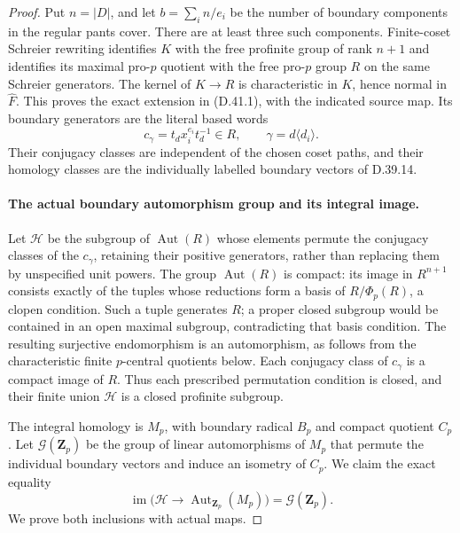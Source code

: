 \begin{proof}
Put \(n=|D|\), and let \(b=\sum_i n/e_i\) be the number
of boundary components in the regular pants cover.
There are at least three such components.
Finite-coset Schreier rewriting identifies \(K\)
with the free profinite group of rank \(n+1\)
and identifies its maximal pro-\(p\) quotient
with the free pro-\(p\) group \(R\) on the same
Schreier generators.
The kernel of \(K\to R\) is characteristic in \(K\),
hence normal in \(\widehat F\).
This proves the exact extension in
\textup{(D.41.1)}, with the indicated source map.
Its boundary generators are the literal based words
\[
 c_\gamma=t_d x_i^{e_i}t_d^{-1}\in R,
       \qquad
 \gamma=d\langle d_i\rangle.
 \tag{D.41.2}
\]
Their conjugacy classes are independent of the
chosen coset paths, and their homology classes
are the individually labelled boundary vectors
of D.39.14.

\paragraph{The actual boundary automorphism group and its integral image.}
Let \(\mathcal H\) be the subgroup of
\(\operatorname{Aut}(R)\) whose elements permute
the conjugacy classes of the \(c_\gamma\), retaining
their positive generators, rather than replacing
them by unspecified unit powers.
The group \(\operatorname{Aut}(R)\) is compact:
its image in \(R^{n+1}\) consists exactly of the
tuples whose reductions form a basis of
\(R/\Phi_p(R)\), a clopen condition.
Such a tuple generates \(R\); a proper closed
subgroup would be contained in an open maximal
subgroup, contradicting that basis condition.
The resulting surjective endomorphism is an
automorphism, as follows from the characteristic
finite \(p\)-central quotients below.
Each conjugacy class of \(c_\gamma\) is a compact
image of \(R\).  Thus each prescribed permutation
condition is closed, and their finite union
\(\mathcal H\) is a closed profinite subgroup.

The integral homology is \(M_p\), with boundary
radical \(B_p\) and compact quotient \(C_p\).
Let \(\mathcal G(\mathbf Z_p)\) be the group of
linear automorphisms of \(M_p\) that permute the
individual boundary vectors and induce an
isometry of \(C_p\).
We claim the exact equality
\[
 \operatorname{im}\bigl(\mathcal H\to
               \operatorname{Aut}_{\mathbf Z_p}(M_p)\bigr)
                       =\mathcal G(\mathbf Z_p).
 \tag{D.41.3}
\]
We prove both inclusions with actual maps.


\end{proof}

